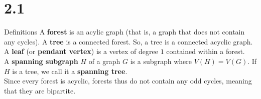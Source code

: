 \documentclass[10pt]{extarticle}
\begin{document}
\section*{2.1}%
\begin{problem}{Definitions}
  A \textbf{forest} is an acylic graph (that is, a graph that does not contain any cycles). A \textbf{tree} is a connected forest. So, a tree is a connected acyclic graph. A \textbf{leaf} (or \textbf{pendant vertex}) is a vertex of degree $1$ contained within a forest.\\

  A \textbf{spanning subgraph} $H$ of a graph $G$ is a subgraph where $V(H) = V(G)$. If $H$ is a tree, we call it a \textbf{spanning tree}. \\

  Since every forest is acyclic, forests thus do not contain any odd cycles, meaning that they are bipartite.
\end{problem}
\end{document}
